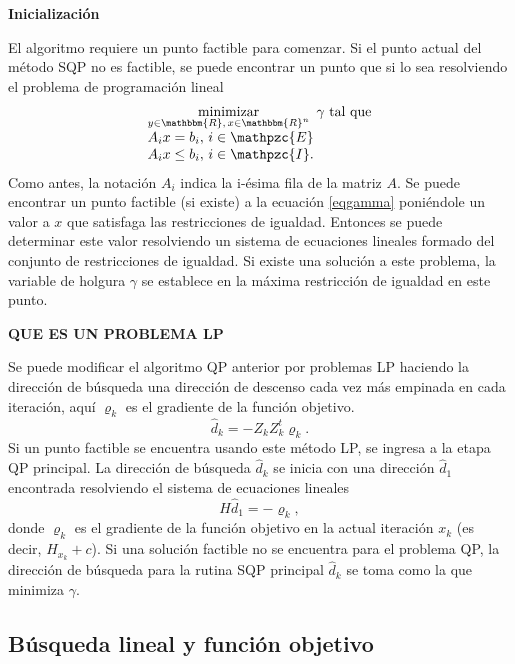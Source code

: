 \documentclass[a4paper,10pt]{book}
\newcommand{\R}{\mathbbm{R}}
\newcommand{\Rn}{\R^n}
\newcommand{\cI}{\mathpzc{I}}
\newcommand{\cE}{\mathpzc{E}}
\begin{document}
\textbf{Inicialización}

El algoritmo requiere un punto factible para comenzar. Si el punto actual del método SQP no es factible, se puede encontrar un punto que si lo sea resolviendo el problema de programación lineal
\begin{equation}\label{eqgamma}
    \begin{array}{ll}
   \displaystyle \mathop{\mathrm{minimizar}}_{y\in\R,\,x\in\Rn}\,\,\gamma\mbox{ tal que}\\
    A_ix=b_i,\,i\in\cE\\
    A_ix\leq b_i,\,i\in\cI.
    \end{array}
\end{equation}
Como antes, la notación $A_i$ indica la i-ésima fila de la matriz $A$. Se puede encontrar un punto factible (si existe) a la ecuación \eqref{eqgamma} poniéndole un valor a $x$ que satisfaga las restricciones de igualdad. Entonces se puede determinar este valor resolviendo un sistema de ecuaciones lineales formado del conjunto de restricciones de igualdad. Si existe una solución a este problema, la variable de holgura $\gamma$ se establece en la máxima restricción de igualdad en este punto.


\textbf{QUE ES UN PROBLEMA LP}

Se puede modificar el algoritmo QP anterior por problemas LP haciendo la dirección de búsqueda una dirección de descenso cada vez más empinada en cada iteración, aquí $\varrho_k$ es el gradiente de la función objetivo. $$\hat{d}_k=-Z_kZ_k^t\varrho_k.$$
Si un punto factible se encuentra usando este método LP, se ingresa a la etapa QP principal. La dirección de búsqueda $\hat{d}_k$ se inicia con una dirección $\hat{d}_1$ encontrada resolviendo el sistema de ecuaciones lineales $$H\hat{d}_1=-\varrho_k,$$
donde $\varrho_k$ es el gradiente de la función objetivo en la actual iteración $x_k$ (es decir, $H_{x_k}+c$).
Si una solución factible no se encuentra para el problema QP, la dirección de búsqueda para la rutina SQP principal $\hat{d}_k$ se toma como la que minimiza $\gamma$.

\subsection{Búsqueda lineal y función objetivo}
\end{document}
